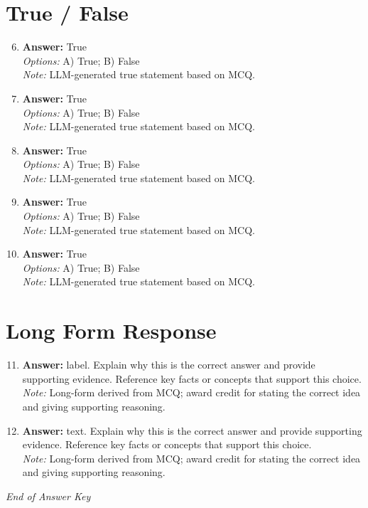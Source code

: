 \documentclass[12pt]{article}
\begin{document}
\section*{True / False}
\begin{enumerate}[label=\arabic*.]
\setcounter{enumi}{5}
\item \textbf{Answer:} True
\\ \textit{Options:} A) True; B) False
\\ \textit{Note:} LLM-generated true statement based on MCQ.
\item \textbf{Answer:} True
\\ \textit{Options:} A) True; B) False
\\ \textit{Note:} LLM-generated true statement based on MCQ.
\item \textbf{Answer:} True
\\ \textit{Options:} A) True; B) False
\\ \textit{Note:} LLM-generated true statement based on MCQ.
\item \textbf{Answer:} True
\\ \textit{Options:} A) True; B) False
\\ \textit{Note:} LLM-generated true statement based on MCQ.
\item \textbf{Answer:} True
\\ \textit{Options:} A) True; B) False
\\ \textit{Note:} LLM-generated true statement based on MCQ.
\end{enumerate}

\section*{Long Form Response}
\begin{enumerate}[label=\arabic*.]
\setcounter{enumi}{10}
\item \textbf{Answer:} label. Explain why this is the correct answer and provide supporting evidence. Reference key facts or concepts that support this choice.
\\ \textit{Note:} Long-form derived from MCQ; award credit for stating the correct idea and giving supporting reasoning.
\item \textbf{Answer:} text. Explain why this is the correct answer and provide supporting evidence. Reference key facts or concepts that support this choice.
\\ \textit{Note:} Long-form derived from MCQ; award credit for stating the correct idea and giving supporting reasoning.
\end{enumerate}

\vfill
\noindent\textit{End of Answer Key}
\end{document}

